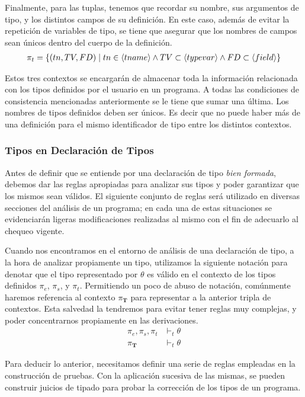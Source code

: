 \documentclass{article}
\begin{document}
Finalmente, para las tuplas, tenemos que recordar su nombre, sus argumentos de tipo, y los distintos campos de su definición.
En este caso, además de evitar la repetición de variables de tipo, se tiene que asegurar que los nombres de campos sean únicos dentro del cuerpo de la definición.
\begin{gather*}
\pi_{t} =
\{
(tn, TV, FD) \mid
tn \in \langle tname \rangle 
\wedge
TV \subset \langle typevar \rangle
\wedge
FD \subset \langle field \rangle
\}
\end{gather*}

Estos tres contextos se encargarán de almacenar toda la información relacionada con los tipos definidos por el usuario en un programa.
A todas las condiciones de consistencia mencionadas anteriormente se le tiene que sumar una última.
Los nombres de tipos definidos deben ser únicos.
Es decir que no puede haber más de una definición para el mismo identificador de tipo entre los distintos contextos.

\subsubsection{Tipos en Declaración de Tipos}

Antes de definir que se entiende por una declaración de tipo \textit{bien formada}, debemos dar las reglas apropiadas para analizar sus tipos y poder garantizar que los mismos sean válidos.
El siguiente conjunto de reglas será utilizado en diversas secciones del análisis de un programa; en cada una de estas situaciones se evidenciarán ligeras modificaciones realizadas al mismo con el fin de adecuarlo al chequeo vigente.

Cuando nos encontramos en el entorno de análisis de una declaración de tipo, a la hora de analizar propiamente un tipo, utilizamos la siguiente notación para denotar que el tipo representado por $\theta$ es válido en el contexto de los tipos definidos $\pi_{e}$, $\pi_{s}$, y $\pi_{t}$.
Permitiendo un poco de abuso de notación, comúnmente haremos referencia al contexto $\pi_{\mathbf{T}}$ para representar a la anterior tripla de contextos.
Esta salvedad la tendremos para evitar tener reglas muy complejas, y poder concentrarnos propiamente en las derivaciones.
\begin{align*}
\pi_{e}, \pi_{s}, \pi_{t} &\vdash_t \theta
\\
\pi_{\mathbf{T}} &\vdash_t \theta
\end{align*}

Para deducir lo anterior, necesitamos definir una serie de reglas empleadas en la construcción de pruebas.
Con la aplicación sucesiva de las mismas, se pueden construir juicios de tipado para probar la corrección de los tipos de un programa.
\end{document}
